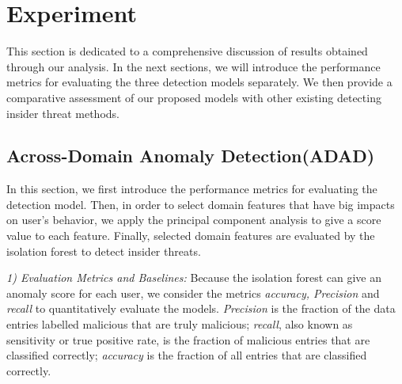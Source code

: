 \documentclass[conference]{IEEEtran}
\begin{document}
\section{Experiment}

This section is dedicated to a comprehensive discussion of results obtained through our analysis.
In the next sections, we will introduce the performance metrics for evaluating the three detection models separately. 
We then provide a comparative assessment of our proposed models with other existing detecting insider threat methods. 


\subsection{Across-Domain Anomaly Detection(ADAD)}\label{AA}
In this section, we first introduce the performance metrics for evaluating the detection model. 
Then, in order to select domain features that have big impacts on user's behavior, we apply the principal component analysis to give a score value to each feature. 
Finally, selected domain features are evaluated by the isolation forest to detect insider threats.


\emph{1) Evaluation Metrics and Baselines:}
Because the isolation forest can give an anomaly score for each user, we consider the metrics \emph{accuracy, Precision} and \emph{recall} to quantitatively evaluate the models.  
\emph{Precision} is the
fraction of the data entries labelled malicious that are
truly malicious; \emph{recall}, also known as sensitivity or true
positive rate, is the fraction of malicious entries that are
classified correctly; \emph{accuracy} is the fraction of all entries
that are classified correctly\cite{b56}.

\end{document}
